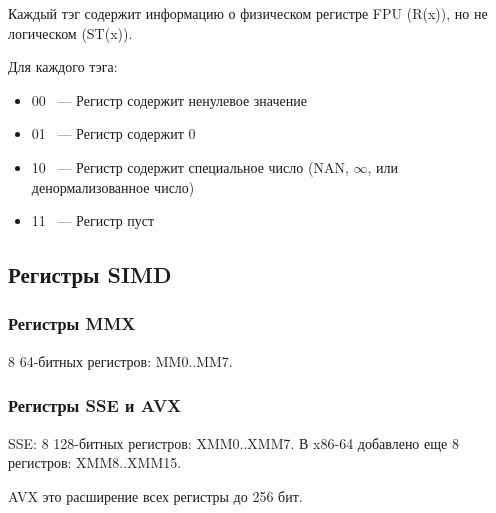 Каждый тэг содержит информацию о физическом регистре FPU (R(x)), но не логическом (ST(x)).

Для каждого тэга:

\begin{itemize}
\item 00 ~--- Регистр содержит ненулевое значение
\item 01 ~--- Регистр содержит 0
\item 10 ~--- Регистр содержит специальное число (\ac{NAN}, $\infty$, или денормализованное число)
\item 11 ~--- Регистр пуст
\end{itemize}

\subsection{Регистры SIMD}

\subsubsection{Регистры MMX}

8 64-битных регистров: MM0..MM7.

\subsubsection{Регистры SSE и AVX}

SSE: 8 128-битных регистров: XMM0..XMM7.
В x86-64 добавлено еще 8 регистров: XMM8..XMM15.

AVX это расширение всех регистры до 256 бит.



